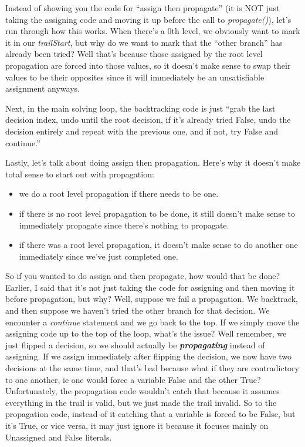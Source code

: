 Instead of showing you the code for ``assign then propagate'' (it is NOT just taking 
the assigning code and moving it up before the call to \textit{propagate()}), let's 
run through how this works. When there's a 0th level, we obviously want to mark it 
in our \textit{trailStart}, but why do we want to mark that the ``other branch'' has 
already been tried? Well that's because those assigned by the root level propagation 
are forced into those values, so it doesn't make sense to swap their values to be 
their opposites since it will immediately be an unsatisfiable assignment anyways. 

Next, in the main solving loop, the backtracking code is just ``grab the last 
decision index, undo until the root decision, if it's already tried False, undo 
the decision entirely and repeat with the previous one, and if not, try False 
and continue.''

Lastly, let's talk about doing assign then propagation. Here's why it doesn't
make total sense to start out with propagation:

\begin{itemize}
    \item we do a root level propagation if there needs to be one.
    \item if there is no root level propagation to be done, it still
            doesn't make sense to immediately propagate since there's 
            nothing to propagate.
    \item if there was a root level propagation, it doesn't make sense 
            to do another one immediately since we've just completed one.
\end{itemize}

So if you wanted to do assign and then propagate, how would that be done? 
Earlier, I said that it's not just taking the code for assigning and then 
moving it before propagation, but why? Well, suppose we fail a propagation. 
We backtrack, and then suppose we haven't tried the other branch for that 
decision. We encounter a \textit{continue} statement and we go back to the 
top. If we simply move the assigning code up to the top of the loop,
what's the issue? Well remember, we just flipped a decision, so we should
actually be \textbf{\textit{propagating}} instead of assigning. If we 
assign immediately after flipping the decision, we now have two decisions 
at the same time, and that's bad because what if they are contradictory to 
one another, ie one would force a variable False and the other True? 
Unfortunately, the propagation code wouldn't catch that because it assumes 
everything in the trail is valid, but we just made the trail invalid. So 
to the propagation code, instead of it catching that a variable is forced to be 
False, but it's True, or vice versa, it may just ignore it because it focuses 
mainly on Unassigned and False literals.

